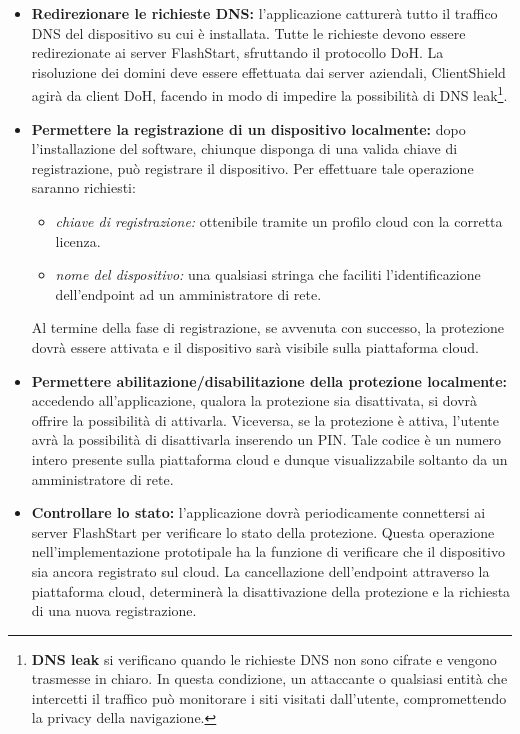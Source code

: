 \documentclass[12pt,a4paper,openright,twoside]{book}
\begin{document}
\begin{itemize}
	\item \textbf{Redirezionare le richieste \gls{DNS}:}
	l'applicazione catturerà tutto il traffico \gls{DNS} del dispositivo su cui è installata.
	Tutte le richieste devono essere redirezionate ai server FlashStart, sfruttando il protocollo \gls{DoH}.
	La risoluzione dei domini deve essere effettuata dai server aziendali, ClientShield agirà da client \gls{DoH}, facendo in modo di impedire la possibilità di \gls{DNS} leak\footnote{\textbf{DNS leak} si verificano quando le richieste \gls{DNS} non sono cifrate e vengono trasmesse in chiaro.  
		In questa condizione, un attaccante o qualsiasi entità che intercetti il traffico può monitorare i siti visitati dall'utente, compromettendo la privacy della navigazione.}.

	
	\item \textbf{Permettere la registrazione di un dispositivo localmente:}
	dopo l'installazione del software, chiunque disponga di una valida chiave di registrazione, può registrare il dispositivo.
	Per effettuare tale operazione saranno richiesti:
	\begin{itemize}
		\item \textit{chiave di registrazione:} ottenibile tramite un profilo cloud con la corretta licenza.
		\item \textit{nome del dispositivo:} una qualsiasi stringa che faciliti l'identificazione dell'endpoint ad un amministratore di rete.
	\end{itemize}
	Al termine della fase di registrazione, se avvenuta con successo, la protezione dovrà essere attivata e il dispositivo sarà visibile sulla piattaforma cloud.
	
	
	\item \textbf{Permettere abilitazione/disabilitazione della protezione localmente:}
	accedendo all'applicazione, qualora la protezione sia disattivata, si dovrà offrire la possibilità di attivarla.
	Viceversa, se la protezione è attiva, l'utente avrà la possibilità di disattivarla inserendo un PIN.
	Tale codice è un numero intero presente sulla piattaforma cloud e dunque visualizzabile soltanto da un amministratore di rete.
	
	\item \textbf{Controllare lo stato:}
	l'applicazione dovrà periodicamente connettersi ai server FlashStart per verificare lo stato della protezione.
	Questa operazione nell'implementazione prototipale ha                                              la funzione di verificare che il dispositivo sia ancora registrato sul cloud.
	La cancellazione dell'endpoint attraverso la piattaforma cloud, determinerà la disattivazione della protezione e la richiesta di una nuova registrazione.
	

\end{itemize}
\end{document}
